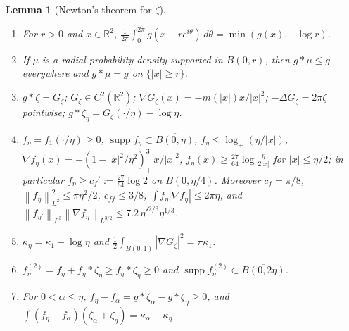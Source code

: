 \documentclass[11pt,reqno]{amsart}
\numberwithin{equation}{section}
\theoremstyle{plain}
\newtheorem{lemma}[theorem]{Lemma}
\theoremstyle{definition}
\newcommand{\R}{\mathbb{R}}
\newcommand{\supp}{\operatorname{supp}}
\newcommand{\norm}[1]{\left\|#1\right\|}
\begin{document}
\begin{lemma}[Newton's theorem for $\zeta$]\label{lem:newton}
\begin{enumerate}[label=\textup{(\alph*)}]
\item For $r>0$ and $x\in\R^2$, $\frac1{2\pi}\int_0^{2\pi}g(x-re^{i\theta})\,d\theta=\min(g(x),-\log r)$.
\item If $\mu$ is a radial probability density supported in $\overline{B(0,r)}$, then $g*\mu\le g$ everywhere and $g*\mu=g$ on $\{|x|\ge r\}$.
\item $g*\zeta=G_\zeta$; $G_\zeta\in C^2(\R^2)$; $\nabla G_\zeta(x)=-m(|x|)x/|x|^2$; $-\Delta G_\zeta=2\pi\zeta$ pointwise; $g*\zeta_\eta=G_\zeta(\cdot/\eta)-\log\eta$.
\item $f_\eta=f_1(\cdot/\eta)\ge0$, $\supp f_\eta\subset\overline{B(0,\eta)}$, $f_\eta\le\log_+(\eta/|x|)$, $\nabla f_\eta(x)=-(1-|x|^2/\eta^2)_+^3\,x/|x|^2$, $f_\eta(x)\ge\frac{27}{64}\log\frac{\eta}{2|x|}$ for $|x|\le\eta/2$; in particular $f_\eta\ge c_f':=\frac{27}{64}\log2$ on $B(0,\eta/4)$.  Moreover $c_f=\pi/8$, $\norm{f_\eta}_{L^2}^2\le\pi\eta^2/2$, $c_{ff}\le3/8$, $\int f_\eta|\nabla f_\eta|\le2\pi\eta$, and $\norm{f_{\eta'}}_{L^3}\norm{\nabla f_\eta}_{L^{3/2}}\le7.2\,\eta'^{2/3}\eta^{1/3}$.
\item $\kappa_\eta=\kappa_1-\log\eta$ and $\frac12\int_{B(0,1)}|\nabla G_\zeta|^2=\pi\kappa_1$.
\item $f^{(2)}_\eta=f_\eta+f_\eta*\zeta_\eta\ge f_\eta*\zeta_\eta\ge0$ and $\supp f^{(2)}_\eta\subset\overline{B(0,2\eta)}$.
\item For $0<\alpha\le\eta$, $f_\eta-f_\alpha=g*\zeta_\alpha-g*\zeta_\eta\ge0$, and $\int(f_\eta-f_\alpha)(\zeta_\alpha+\zeta_\eta)=\kappa_\alpha-\kappa_\eta$.
\end{enumerate}
\end{lemma}
\end{document}
